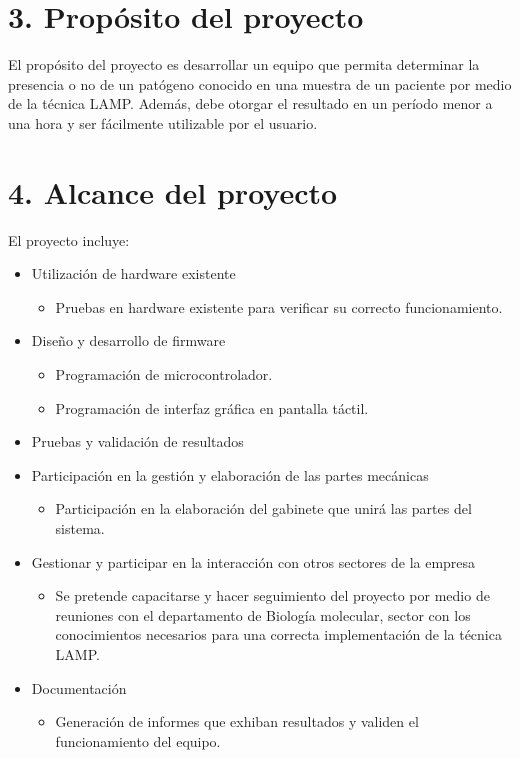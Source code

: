 \documentclass[
11pt, %
]{charter}
\begin{document}
\section{3. Propósito del proyecto}
\label{sec:proposito}

El propósito del proyecto es desarrollar un equipo que permita determinar la presencia o no de un patógeno conocido en una muestra de un paciente por medio de la técnica LAMP. Además, debe otorgar el resultado en un período menor a una hora y ser fácilmente utilizable por el usuario.


\section{4. Alcance del proyecto}
\label{sec:alcance}



El proyecto incluye:
\begin{itemize}
	\item Utilización de hardware existente
	\begin{itemize}
		\item Pruebas en hardware existente para verificar su correcto funcionamiento.
	\end{itemize}
	\item Diseño y desarrollo de firmware
	\begin{itemize}
		\item Programación de microcontrolador.
		\item Programación de interfaz gráfica en pantalla táctil.
	\end{itemize}
	\item Pruebas y validación de resultados
	\item Participación en la gestión y elaboración de las partes mecánicas
		\begin{itemize}
		\item Participación en la elaboración del gabinete que unirá las partes del sistema.
	\end{itemize}
	\item Gestionar y participar en la interacción con otros sectores de la empresa
	\begin{itemize}
		\item Se pretende capacitarse y hacer seguimiento del proyecto por medio de reuniones con el departamento de Biología molecular, sector con los conocimientos necesarios para una correcta implementación de la técnica LAMP.
	\end{itemize}
	\item Documentación
	\begin{itemize}
		\item Generación de informes que exhiban resultados y validen el funcionamiento del equipo.
	\end{itemize}
	
\end{itemize}
\end{document}
